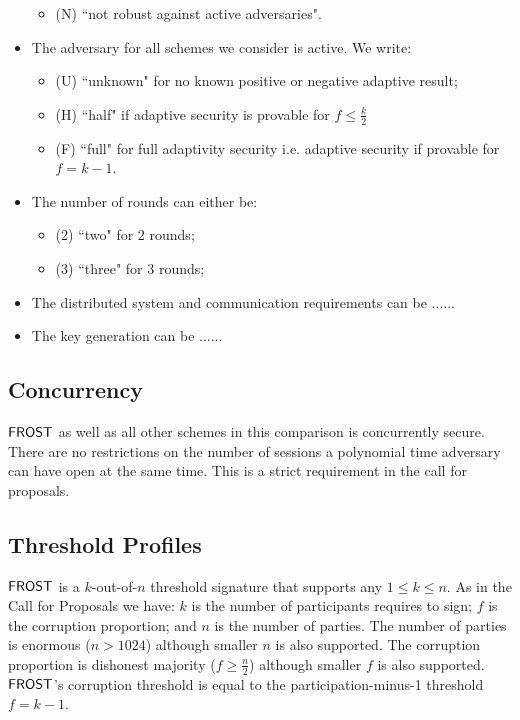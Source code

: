 \begin{itemize}
\begin{itemize}
 			\item (N) ``not robust against active adversaries". 
 		\end{itemize}
 	\item The adversary for all schemes we consider is active.  We write:
 		\begin{itemize}
 			\item (U)  ``unknown" for no known positive or negative adaptive result; 
 			\item (H) ``half" if adaptive security is provable for $f \leq \frac{k}{2}$
 			\item (F) ``full" for full adaptivity security i.e. adaptive security if provable for $f = k - 1$.
 		\end{itemize}
 	\item The number of rounds  can either be:
 	\begin{itemize}
 		\item (2) ``two" for $2$ rounds;
 		\item (3) ``three" for $3$ rounds;
 	\end{itemize}
 	\item The distributed system and communication requirements can be ......
 	\item The key generation can be ......
\end{itemize}   

\subsection{Concurrency}\label{section:comparisons:concurrency}
$\mathsf{FROST}$ as well as all other schemes in this comparison is concurrently secure.  
There are no restrictions on the number of sessions a polynomial time adversary can have open at the same time.
This is a strict requirement in the call for proposals.

\subsection{Threshold Profiles}
$\mathsf{FROST}$ is a $k$-out-of-$n$ threshold signature that supports any $1 \leq k \leq n$.
As in the Call for Proposals \cite{} we have: $k$ is the number of participants requires to sign; $f$ is the corruption proportion; and  $n$ is the number of parties.
The number of parties is enormous ($n > 1024$) although smaller $n$ is also supported.
The corruption proportion is dishonest majority ($f \geq \frac{n}{2}$) although smaller $f$ is also supported.
$\mathsf{FROST}$'s corruption threshold is equal to the participation-minus-1 threshold $f = k-1$.


